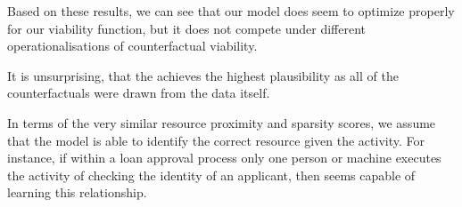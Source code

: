 \documentclass[./../../paper.tex]{subfiles}
\begin{document}
Based on these results, we can see that our model does seem  to optimize properly for our viability function, but it does not compete under different operationalisations of counterfactual viability. 

It is unsurprising, that the \ModelCBG achieves the highest plausibility as all of the counterfactuals were drawn from the data itself. 

In terms of the very similar resource proximity and sparsity scores, we assume that the model is able to identify the correct resource given the activity. For instance, if within a loan approval process only one person or machine executes the activity of checking the identity of an applicant, then \ModelEVOFSR seems capable of learning this relationship.  
\end{document}
